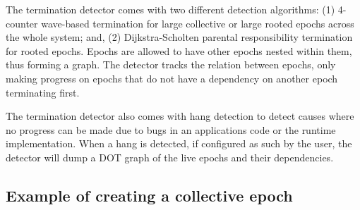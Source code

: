 The termination detector comes with two different detection algorithms\+: (1) 4-\/counter wave-\/based termination for large collective or large rooted epochs across the whole system; and, (2) Dijkstra-\/\+Scholten parental responsibility termination for rooted epochs. Epochs are allowed to have other epochs nested within them, thus forming a graph. The detector tracks the relation between epochs, only making progress on epochs that do not have a dependency on another epoch terminating first.

The termination detector also comes with hang detection to detect causes where no progress can be made due to bugs in an application\textquotesingle{}s code or the runtime implementation. When a hang is detected, if configured as such by the user, the detector will dump a D\+OT graph of the live epochs and their dependencies.\hypertarget{term_term-collective-example}{}\subsection{Example of creating a collective epoch}\label{term_term-collective-example}


